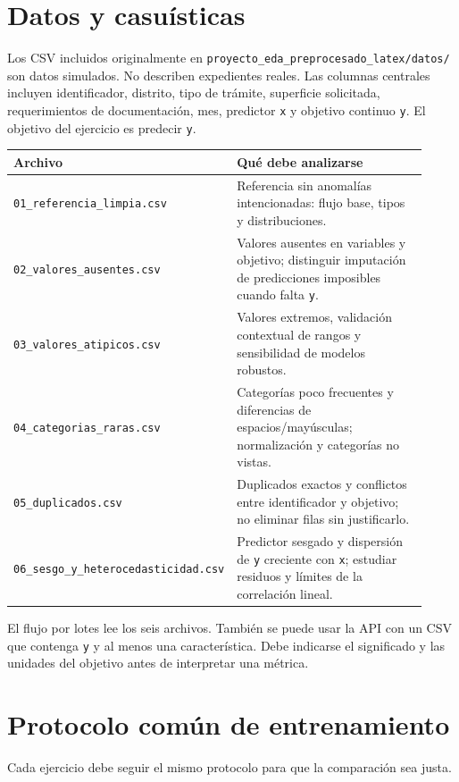\documentclass[11pt,a4paper]{article}
\begin{document}
\section{Datos y casuísticas}
Los CSV incluidos originalmente en \texttt{proyecto\_eda\_preprocesado\_latex/datos/} son datos simulados. No describen expedientes reales. Las columnas centrales incluyen identificador, distrito, tipo de trámite, superficie solicitada, requerimientos de documentación, mes, predictor \texttt{x} y objetivo continuo \texttt{y}. El objetivo del ejercicio es predecir \texttt{y}.

\begin{longtable}{p{0.34\linewidth}p{0.58\linewidth}}
\toprule
\textbf{Archivo} & \textbf{Qué debe analizarse}\\
\midrule
\endhead
\texttt{01\_referencia\_limpia.csv} & Referencia sin anomalías intencionadas: flujo base, tipos y distribuciones.\\
\texttt{02\_valores\_ausentes.csv} & Valores ausentes en variables y objetivo; distinguir imputación de predicciones imposibles cuando falta \texttt{y}.\\
\texttt{03\_valores\_atipicos.csv} & Valores extremos, validación contextual de rangos y sensibilidad de modelos robustos.\\
\texttt{04\_categorias\_raras.csv} & Categorías poco frecuentes y diferencias de espacios/mayúsculas; normalización y categorías no vistas.\\
\texttt{05\_duplicados.csv} & Duplicados exactos y conflictos entre identificador y objetivo; no eliminar filas sin justificarlo.\\
\texttt{06\_sesgo\_y\_heterocedasticidad.csv} & Predictor sesgado y dispersión de \texttt{y} creciente con \texttt{x}; estudiar residuos y límites de la correlación lineal.\\
\bottomrule
\end{longtable}

El flujo por lotes lee los seis archivos. También se puede usar la API con un CSV que contenga \texttt{y} y al menos una característica. Debe indicarse el significado y las unidades del objetivo antes de interpretar una métrica.

\section{Protocolo común de entrenamiento}
Cada ejercicio debe seguir el mismo protocolo para que la comparación sea justa.
\end{document}
